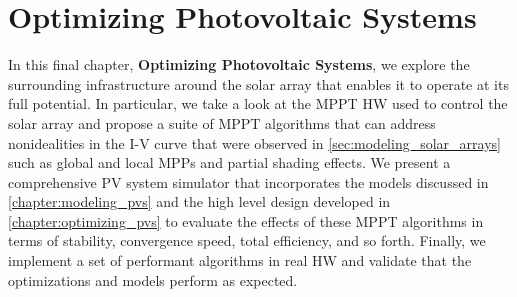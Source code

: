 \chapter{Optimizing Photovoltaic Systems}\label{chapter:optimizing_pv_systems}

In this final chapter, \textbf{Optimizing Photovoltaic Systems}, we explore the
surrounding infrastructure around the solar array that enables it to operate at
its full potential. In particular, we take a look at the \acf{MPPT} \acf{HW}
used to control the solar array and propose a suite of MPPT algorithms that can
address nonidealities in the \ac{I-V} curve that were observed in
\autoref{sec:modeling_solar_arrays} such as global and local \acfp{MPP} and partial
shading effects. We present a comprehensive \ac{PV} system simulator that
incorporates the models discussed in \autoref{chapter:modeling_pvs} and the
high level design developed in \autoref{chapter:optimizing_pvs} to evaluate the
effects of these \ac{MPPT} algorithms in terms of stability, convergence speed,
total efficiency, and so forth. Finally, we implement a set of performant
algorithms in real \ac{HW} and validate that the optimizations and models
perform as expected.

